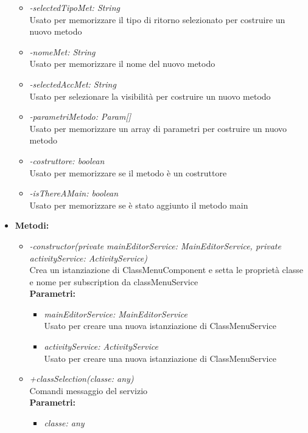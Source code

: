 \begin{itemize}
\begin{itemize}
			\item \emph{-selectedTipoMet: String}\\
			Usato per memorizzare il tipo di ritorno selezionato per costruire un nuovo metodo
			\item \emph{-nomeMet: String}\\
			Usato per memorizzare il nome del nuovo metodo
			\item \emph{-selectedAccMet: String}\\
			Usato per selezionare la visibilità per costruire un nuovo metodo
			\item \emph{-parametriMetodo: Param[]}\\
			Usato per memorizzare un array di parametri per costruire un nuovo metodo
			\item \emph{-costruttore: boolean}\\
			Usato per memorizzare se il metodo è un costruttore
			\item \emph{-isThereAMain: boolean}\\
			Usato per memorizzare se è stato aggiunto il metodo main
		\end{itemize}
	\item \textbf{Metodi:}
		\begin{itemize}
			\item \emph{-constructor(private mainEditorService: MainEditorService,
    private activityService: ActivityService)}\\
    		Crea un istanziazione di ClassMenuComponent e setta le proprietà classe e nome per subscription da classMenuService\\
    		\textbf{Parametri:}
    		\begin{itemize}
    			\item \emph{mainEditorService: MainEditorService}\\
    			Usato per creare una nuova istanziazione di ClassMenuService
    			\item \emph{activityService: ActivityService}\\
    			Usato per creare una nuova istanziazione di ClassMenuService
    		\end{itemize}
    		\item \emph{+classSelection(classe: any)}\\
    		Comandi messaggio del servizio\\
    		\textbf{Parametri:}
    		\begin{itemize}
    			\item \emph{classe: any}\\

\end{itemize}
\end{itemize}
\end{itemize}
